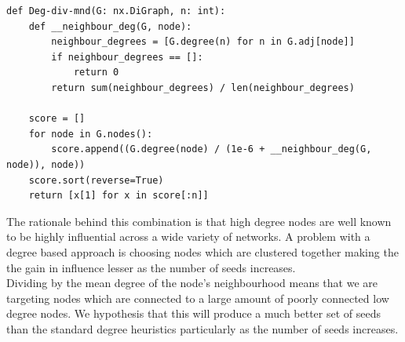 \documentclass{article}
\begin{document}
\begin{verbatim}
def Deg-div-mnd(G: nx.DiGraph, n: int):
    def __neighbour_deg(G, node):
        neighbour_degrees = [G.degree(n) for n in G.adj[node]]
        if neighbour_degrees == []:
            return 0
        return sum(neighbour_degrees) / len(neighbour_degrees)

    score = []
    for node in G.nodes():
        score.append((G.degree(node) / (1e-6 + __neighbour_deg(G, node)), node))
    score.sort(reverse=True)
    return [x[1] for x in score[:n]]
\end{verbatim}

The rationale behind this combination is that high degree nodes are well known to be highly influential across a wide variety of networks.
A problem with a degree based approach is choosing nodes which are clustered together making the the gain in influence lesser as the number of seeds increases.
\\

Dividing by the mean degree of the node's neighbourhood means that we are targeting nodes which are connected to a large amount of poorly connected low degree nodes.
We hypothesis that this will produce a much better set of seeds than the standard degree heuristics particularly as the number of seeds increases.
\end{document}

